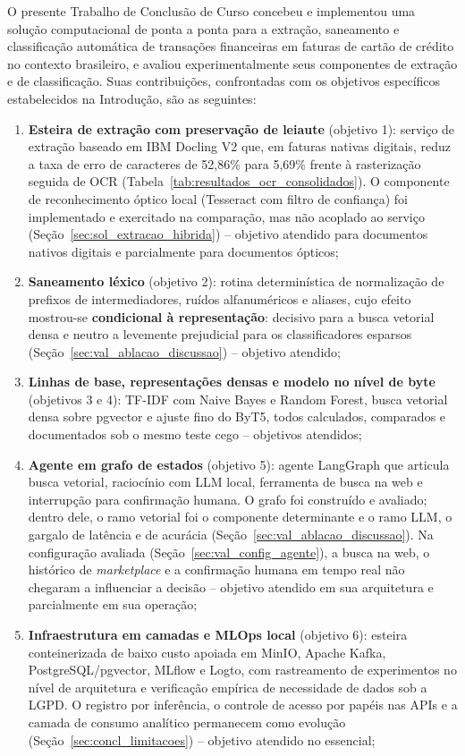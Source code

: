 O presente Trabalho de Conclusão de Curso concebeu e implementou uma solução computacional de ponta a ponta para a extração, saneamento e classificação automática de transações financeiras em faturas de cartão de crédito no contexto brasileiro, e avaliou experimentalmente seus componentes de extração e de classificação. Suas contribuições, confrontadas com os objetivos específicos estabelecidos na Introdução, são as seguintes:
\begin{enumerate}
	\item \textbf{Esteira de extração com preservação de leiaute} (objetivo 1): serviço de extração baseado em IBM Docling V2 que, em faturas nativas digitais, reduz a taxa de erro de caracteres de 52,86\% para 5,69\% frente à rasterização seguida de OCR (Tabela~\ref{tab:resultados_ocr_consolidados}). O componente de reconhecimento óptico local (Tesseract com filtro de confiança) foi implementado e exercitado na comparação, mas não acoplado ao serviço (Seção~\ref{sec:sol_extracao_hibrida}) -- objetivo atendido para documentos nativos digitais e parcialmente para documentos ópticos;
	\item \textbf{Saneamento léxico} (objetivo 2): rotina determinística de normalização de prefixos de intermediadores, ruídos alfanuméricos e aliases, cujo efeito mostrou-se \textbf{condicional à representação}: decisivo para a busca vetorial densa e neutro a levemente prejudicial para os classificadores esparsos (Seção~\ref{sec:val_ablacao_discussao}) -- objetivo atendido;
	\item \textbf{Linhas de base, representações densas e modelo no nível de byte} (objetivos 3 e 4): TF-IDF com Naive Bayes e Random Forest, busca vetorial densa sobre pgvector e ajuste fino do ByT5, todos calculados, comparados e documentados sob o mesmo teste cego -- objetivos atendidos;
	\item \textbf{Agente em grafo de estados} (objetivo 5): agente LangGraph que articula busca vetorial, raciocínio com LLM local, ferramenta de busca na web e interrupção para confirmação humana. O grafo foi construído e avaliado; dentro dele, o ramo vetorial foi o componente determinante e o ramo LLM, o gargalo de latência e de acurácia (Seção~\ref{sec:val_ablacao_discussao}). Na configuração avaliada (Seção~\ref{sec:val_config_agente}), a busca na web, o histórico de \textit{marketplace} e a confirmação humana em tempo real não chegaram a influenciar a decisão -- objetivo atendido em sua arquitetura e parcialmente em sua operação;
	\item \textbf{Infraestrutura em camadas e MLOps local} (objetivo 6): esteira conteinerizada de baixo custo apoiada em MinIO, Apache Kafka, PostgreSQL/pgvector, MLflow e Logto, com rastreamento de experimentos no nível de arquitetura e verificação empírica de necessidade de dados sob a LGPD. O registro por inferência, o controle de acesso por papéis nas APIs e a camada de consumo analítico permanecem como evolução (Seção~\ref{sec:concl_limitacoes}) -- objetivo atendido no essencial;

\end{enumerate}
